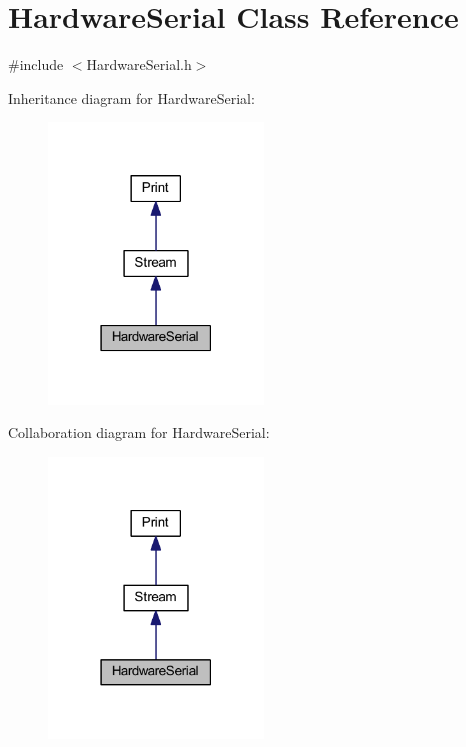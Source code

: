\hypertarget{class_hardware_serial}{}\section{Hardware\+Serial Class Reference}
\label{class_hardware_serial}


{\ttfamily \#include $<$Hardware\+Serial.\+h$>$}



Inheritance diagram for Hardware\+Serial\+:
\nopagebreak
\begin{figure}[H]
\begin{center}
\leavevmode
\includegraphics[width=162pt]{class_hardware_serial__inherit__graph}
\end{center}
\end{figure}


Collaboration diagram for Hardware\+Serial\+:
\nopagebreak
\begin{figure}[H]
\begin{center}
\leavevmode
\includegraphics[width=162pt]{class_hardware_serial__coll__graph}
\end{center}
\end{figure}

